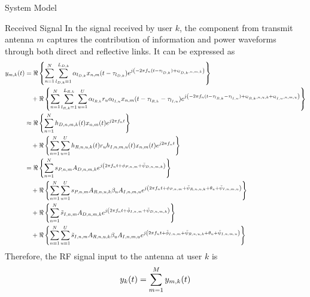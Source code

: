 \documentclass{IEEEtran}
\begin{document}
\begin{section} {System Model}
        \begin{subsection} {Received Signal}
            In the signal received by user $k$, the component from transmit antenna $m$ captures the contribution of information and power waveforms through both direct and reflective links. It can be expressed as
            \begin{equation} \label{eq:y_{m,k}(t)}
                \begin{split}
                    y_{m,k}(t)
                    &= \Re \left\{ \sum_{n=1}^{N} \sum_{l_{D,k}=1}^{L_{D,k}} \alpha_{l_{D,k}} x_{n,m}(t-\tau_{l_{D,k}}) e^{j \left( -2 \pi f_n (t-\tau_{l_{D,k}})+\varsigma_{l_{D,k},n,m,k}\right) } \right\} \\
                    &\quad+ \Re \left\{ \sum_{n=1}^{N} \sum_{l_{R,k}=1}^{L_{R,k}} \sum_{u=1}^{U} \alpha_{l_{R,k}} r_u \alpha_{l_{I,u}} x_{n,m}(t-\tau_{l_{R,k}}-\tau_{l_{I,u}}) e^{j \left( -2 \pi f_n (t-\tau_{l_{R,k}}-\tau_{l_{I,u}})+\varsigma_{l_{R,k},n,u,k}+\varsigma_{l_{I,u},n,m,u}\right)} \right\} \\
                    &\approx \Re \left\{ \sum_{n=1}^{N} h_{D,n,m,k}(t) x_{n,m}(t) e^{j2 \pi f_n t} \right\} \\
                    &\quad+ \Re \left\{ \sum_{n=1}^{N} \sum_{u=1}^{U} h_{R,n,u,k}(t) r_u h_{I,n,m,u}(t) x_{n,m}(t) e^{j2 \pi f_n t} \right\} \\
                    &= \Re \left\{ \sum_{n=1}^{N} {s_{P,n,m}}{A_{D,n,m,k}} e^{j\left( 2{\pi}{f_n}{t}+\phi_{P,n,m}+\bar{\psi}_{D,n,m,k} \right)} \right\} \\
                    &\quad+ \Re \left\{ \sum_{n=1}^{N} \sum_{u=1}^{U} {s_{P,n,m}}{A_{R,n,u,k}}{\beta_u}{A_{I,n,m,u}} e^{j\left( 2{\pi}{f_n}{t}+\phi_{P,n,m}+\bar{\psi}_{R,n,u,k}+\theta_u+\bar{\psi}_{I,n,m,u} \right)} \right\} \\
                    &\quad+ \Re \left\{ \sum_{n=1}^{N} {\tilde{s}_{I,n,m}}{A_{D,n,m,k}} e^{j\left( 2{\pi}{f_n}{t}+\tilde{\phi}_{I,n,m}+\bar{\psi}_{D,n,m,k} \right)} \right\} \\
                    &\quad+ \Re \left\{ \sum_{n=1}^{N} \sum_{u=1}^{U} {\tilde{s}_{I,n,m}}{A_{R,n,u,k}}{\beta_u}{A_{I,n,m,u}} e^{j\left( 2{\pi}{f_n}{t}+\tilde{\phi}_{I,n,m}+\bar{\psi}_{R,n,u,k}+\theta_u+\bar{\psi}_{I,n,m,u} \right)} \right\}
                \end{split}
            \end{equation}
            Therefore, the RF signal input to the antenna at user $k$ is
            \begin{equation} \label{eq:y_{k}(t)}
                y_{k}(t) = \sum_{m=1}^{M} y_{m,k}(t)
            \end{equation}
        \end{subsection}
    \end{section}

    
    
\end{document}
